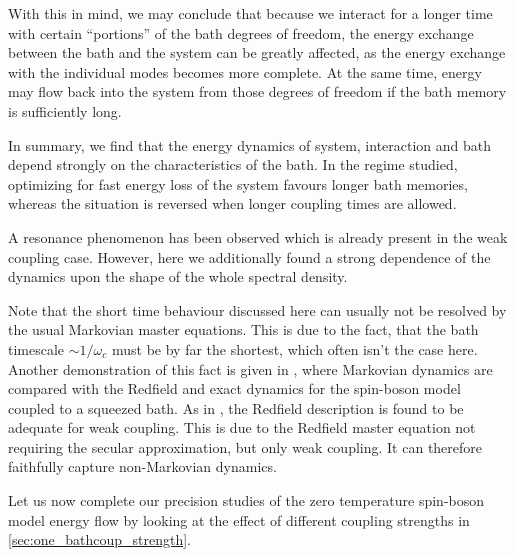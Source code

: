 With this in mind, we may conclude that because we interact for a
longer time with certain ``portions'' of the bath degrees of freedom,
the energy exchange between the bath and the system can be greatly
affected, as the energy exchange with the individual modes becomes
more complete.  At the same time, energy may flow back into the system
from those degrees of freedom if the bath memory is sufficiently
long.

In summary, we find that the energy dynamics of system, interaction
and bath depend strongly on the characteristics of the bath.  In the
regime studied, optimizing for fast energy loss of the system favours
longer bath memories, whereas the situation is reversed when longer
coupling times are allowed.

A resonance phenomenon has been observed which is already present in
the weak coupling case. However, here we additionally found a strong
dependence of the dynamics upon the shape of the whole spectral
density.

Note that the short time behaviour discussed here can usually not be
resolved by the usual Markovian master equations. This is due to the
fact, that the bath timescale \(\sim 1/ω_{c}\) must be by far the
shortest, which often isn't the case here. Another demonstration of
this fact is given in \cite{Link2022Feb}, where Markovian dynamics are
compared with the Redfield and exact dynamics for the spin-boson model
coupled to a squeezed bath. As in \cite{Xu2022Mar}, the Redfield
description is found to be adequate for weak coupling. This is due to
the Redfield master equation not requiring the secular approximation,
but only weak coupling. It can therefore faithfully capture
non-Markovian dynamics.

Let us now complete our precision studies of the zero temperature
spin-boson model energy flow by looking at the effect of different
coupling strengths in \cref{sec:one_bathcoup_strength}.

